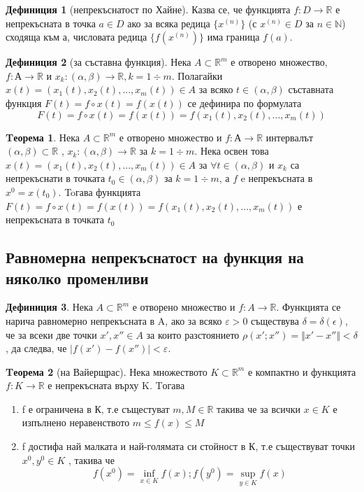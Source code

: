 \documentclass[a4paper,fleqn,12pt]{article}
\theoremstyle{definition}
\newtheorem{theorem}{Tеорема}[subsection]
\newtheorem{definition}{Дефиниция}[subsection]
\begin{document}
\begin{definition}[непрекъснатост по Хайне]
Казва се, че функцията $f: D \to \mathbb{R}$ е непрекъсната в точка $a \in D$ ако за всяка редица  $\{x^{(n)}\}$ (с $x^{(n)} \in D$ за $n \in \mathbb{N}$) сходяща към а, числовата редица $\{f(x^{(n)})\}$ има граница $f(a)$. 
\end{definition}

\begin{definition}[за съставна функция]
Нека $A \subset \mathbb{R}^m$ е отворено множество, $f: А \to \mathbb{R}$ и $x_k: (\alpha, \beta) \to \mathbb{R}, k = 1 \div m$. Полагайки  $x(t) = (x_1(t), x_2(t), ... , x_m(t)) \in A$ за всяко $t \in (\alpha, \beta)$ съставната функция $F(t) = f \circ x(t) = f(x(t))$ се дефинира по формулата 
$$F(t) = f \circ x(t) = f(x(t)) = f(x_1(t), x_2(t), ... , x_m(t))$$
\end{definition}

\begin{theorem}
Нека $A \subset \mathbb{R}^m$ е отворено множество и $f: А \to \mathbb{R}$ интервалът $(\alpha, \beta) \subset \mathbb{R}$ , $x_k: (\alpha, \beta) \to \mathbb{R} $ за $k = 1 \div m$. Нека освен това $x(t) = (x_1(t), x_2(t), ... , x_m(t)) \in A$ за $\forall t \in (\alpha, \beta)$ и $x_k$ са непрекъснати в точката $t_0 \in (\alpha, \beta) $  за $k = 1 \div m$, а $f$ e непрекъсната в $x^0 = x(t_0)$. Toгава функцията $F(t) = f \circ x(t) = f(x(t)) = f(x_1(t), x_2(t), ... , x_m(t))$ е непрекъсната в точката $t_0$
\end{theorem}

\subsection{Равномерна непрекъснатост на функция на няколко променливи}
\begin{definition}
Нека $A \subset \mathbb{R}^m$ е отворено множество и $f: A \to \mathbb{R}$. Функцията се нарича равномерно непрекъсната в A, ако за  всяко $\varepsilon > 0$ съществува $\delta = \delta(\epsilon)$, че за всеки две точки $x', x'' \in A$ за които разстоянието $\rho(x';x'') =\Vert x' - x'' \Vert < \delta $, да следва, че $\vert f(x') - f(x'') \vert  < \varepsilon$.
\end{definition}

\begin{theorem}[на Вайерщрас]
Нека множеството $K \subset \mathbb{R}^m$ е компактно и функцията $f: K \to \mathbb{R}$ е непрекъсната върху K. Tогава 

\begin{enumerate}
		\item f е ограничена в К, т.е същестуват $m, M \in \mathbb{R}$ такива че за всички $x \in K$ е изпълнено неравенството
$m \leq f(x) \leq M$
		\item f достифа най малката и най-голямата си стойност в К, т.е съществуват точки $x^0, y^0 \in K$ , такива че
$$f(x^0) = \inf _{x \in K}f(x) ; f(y^0) = \sup_{y \in K} f(x)$$
\end{enumerate}

\end{theorem}
\end{document}
